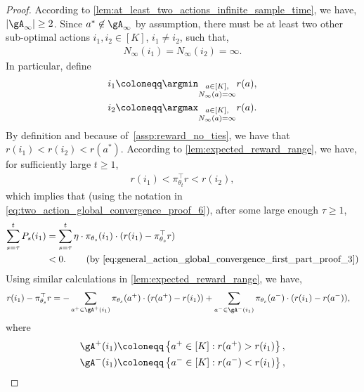 \begin{proof}
According to \cref{lem:at_least_two_actions_infinite_sample_time}, we have, $| \gA_\infty | \ge 2$. Since $a^* \not\in \gA_\infty$ by assumption, there must be at least two other sub-optimal actions $i_1, i_2 \in [K]$, $i_1 \ne i_2$, such that,
\begin{align}
\label{eq:general_action_global_convergence_first_part_proof_1}
    N_\infty(i_1) = N_\infty(i_2) = \infty.
\end{align}
In particular, define
\begin{align}
\label{eq:general_action_global_convergence_first_part_proof_2}
    i_1 &\coloneqq \argmin_{\substack{a \in [K], \\ N_\infty(a) = \infty}} r(a), \\
    i_2 &\coloneqq \argmax_{\substack{a \in [K], \\ N_\infty(a) = \infty}} r(a).
\end{align}
By definition and because of~\cref{assp:reward_no_ties}, we have that $r(i_1) < r(i_2) < r(a^*)$. According to \cref{lem:expected_reward_range}, we have, for sufficiently large $t \ge 1$,
\begin{align}
\label{eq:general_action_global_convergence_first_part_proof_3}
    r(i_1) < \pi_{\theta_t}^\top r < r(i_2),
\end{align}
which implies that (using the notation in \cref{eq:two_action_global_convergence_proof_6}), after some large enough $\tau \ge 1$,
\begin{align}
\label{eq:general_action_global_convergence_first_part_proof_4}
    \sum_{s=\tau}^t P_s(i_1) &= \sum_{s=\tau}^t \eta \cdot \pi_{\theta_s}(i_1) \cdot ( r(i_1) - \pi_{\theta_s}^\top r ) \\
    & < 0. \qquad \left(\text{by \cref{eq:general_action_global_convergence_first_part_proof_3}}\right)
\end{align}
Using similar calculations in \cref{lem:expected_reward_range}, we have,
\begin{align}
\label{eq:general_action_global_convergence_first_part_proof_5}
    r(i_1) - \pi_{\theta_s}^\top r &= - \sum_{a^+ \in \gA^+(i_1)}{ \pi_{\theta_s}(a^+) \cdot (r(a^+) - r(i_1) ) } + \sum_{a^- \in \gA^-(i_1)}{ \pi_{\theta_s}(a^-) \cdot ( r(i_1) - r(a^-)) },
\end{align}
where
\begin{align}
\label{eq:general_action_global_convergence_first_part_proof_6}
    \gA^+(i_1) &\coloneqq \left\{ a^+ \in [K]: r(a^+) > r(i_1) \right\}, \\
    \gA^-(i_1) &\coloneqq \left\{ a^- \in [K]: r(a^-) < r(i_1) \right\},

\end{align}
\end{proof}
